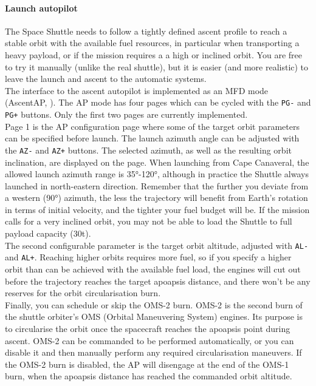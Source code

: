 \documentclass[Orbiter User Manual.tex]{subfiles}
\begin{document}
\paragraph{Launch autopilot}
The Space Shuttle needs to follow a tightly defined ascent profile to reach a stable orbit with the available fuel resources, in particular when transporting a heavy payload, or if the mission requires a a high or inclined orbit. You are free to try it manually (unlike the real shuttle), but it is easier (and more realistic) to leave the launch and ascent to the automatic systems.\\

The interface to the ascent autopilot is implemented as an MFD mode (AscentAP, ). The AP mode has four pages which can be cycled with the \texttt{PG-} and \texttt{PG+} buttons. Only the first two pages are currently implemented.\\

Page 1 is the AP configuration page where some of the target orbit parameters can be specified before launch. The launch azimuth angle can be adjusted with the \texttt{AZ-} and \texttt{AZ+} buttons. The selected azimuth, as well as the resulting orbit inclination, are displayed on the page. When launching from Cape Canaveral, the allowed launch azimuth range is 35°-120°, although in practice the Shuttle always launched in north-eastern direction. Remember that the further you deviate from a western (90°) azimuth, the less the trajectory will benefit from Earth's rotation in terms of initial velocity, and the tighter your fuel budget will be. If the mission calls for a very inclined orbit, you may not be able to load the Shuttle to full payload capacity (30t).\\

The second configurable parameter is the target orbit altitude, adjusted with \texttt{AL-} and \texttt{AL+}. Reaching higher orbits requires more fuel, so if you specify a higher orbit than can be achieved with the available fuel load, the engines will cut out before the trajectory reaches the target apoapsis distance, and there won't be any reserves for the orbit circularisation burn.\\

Finally, you can schedule or skip the OMS-2 burn. OMS-2 is the second burn of the shuttle orbiter's OMS (Orbital Maneuvering System) engines. Its purpose is to circularise the orbit once the spacecraft reaches the apoapsis point during ascent. OMS-2 can be commanded to be performed automatically, or you can disable it and then manually perform any required circularisation maneuvers. If the OMS-2 burn is disabled, the AP will disengage at the end of the OMS-1 burn, when the apoapsis distance has reached the commanded orbit altitude.\\ 
\end{document}
